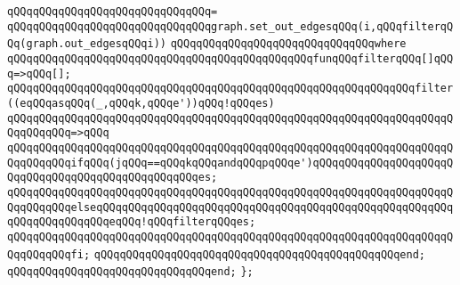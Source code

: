 \verb|qQQqqQQqqQQqqQQqqQQqqQQqqQQqqQQq=|\newline
\verb|qQQqqQQqqQQqqQQqqQQqqQQqqQQqqQQqgraph.set_out_edgesqQQq(i,qQQqfilterqQQq(graph.out_edgesqQQqi))|\newline
\verb|qQQqqQQqqQQqqQQqqQQqqQQqqQQqqQQqwhere|\newline
\verb|qQQqqQQqqQQqqQQqqQQqqQQqqQQqqQQqqQQqqQQqqQQqqQQqfunqQQqfilterqQQq[]qQQq=>qQQq[];|\newline
\newline
\verb|qQQqqQQqqQQqqQQqqQQqqQQqqQQqqQQqqQQqqQQqqQQqqQQqqQQqqQQqqQQqqQQqfilter((eqQQqasqQQq(_,qQQqk,qQQqe'))qQQq!qQQqes)|\newline
\verb|qQQqqQQqqQQqqQQqqQQqqQQqqQQqqQQqqQQqqQQqqQQqqQQqqQQqqQQqqQQqqQQqqQQqqQQqqQQqqQQq=>qQQq|\newline
\verb|qQQqqQQqqQQqqQQqqQQqqQQqqQQqqQQqqQQqqQQqqQQqqQQqqQQqqQQqqQQqqQQqqQQqqQQqqQQqqQQqifqQQq(jqQQq==qQQqkqQQqandqQQqpqQQqe')qQQqqQQqqQQqqQQqqQQqqQQqqQQqqQQqqQQqqQQqqQQqqQQqqQQqes;|\newline
\verb|qQQqqQQqqQQqqQQqqQQqqQQqqQQqqQQqqQQqqQQqqQQqqQQqqQQqqQQqqQQqqQQqqQQqqQQqqQQqqQQqelseqQQqqQQqqQQqqQQqqQQqqQQqqQQqqQQqqQQqqQQqqQQqqQQqqQQqqQQqqQQqqQQqqQQqqQQqeqQQq!qQQqfilterqQQqes;|\newline
\verb|qQQqqQQqqQQqqQQqqQQqqQQqqQQqqQQqqQQqqQQqqQQqqQQqqQQqqQQqqQQqqQQqqQQqqQQqqQQqqQQqfi;|\newline
\verb|qQQqqQQqqQQqqQQqqQQqqQQqqQQqqQQqqQQqqQQqqQQqqQQqend;|\newline
\verb|qQQqqQQqqQQqqQQqqQQqqQQqqQQqqQQqend;|\newline
\newline
\verb|};|\newline
\newline
\newline

